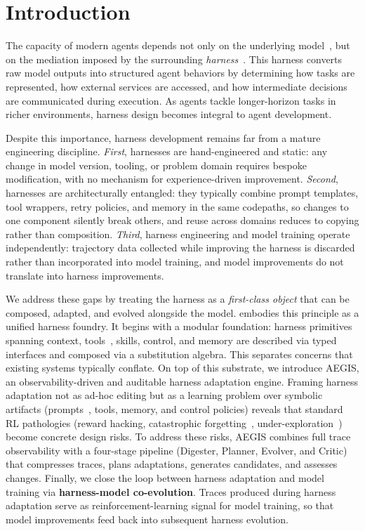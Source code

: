 \section{Introduction}
\label{sec:intro}

The capacity of modern agents depends not only on the underlying model~\cite{deepseekai2026deepseekv4,glm5team2026glm5vibecodingagentic, yang2025qwen3,team2023gemini}, but on the mediation imposed by the surrounding \textit{harness}~\cite{lu2026openclaw,liagent,claudecode}. This harness converts raw model outputs into structured agent behaviors by determining how tasks are represented, how external services are accessed, and how intermediate decisions are communicated during execution. As agents tackle longer-horizon tasks in richer environments, harness design becomes integral to agent development.

Despite this importance, harness development remains far from a mature engineering discipline. \textit{First}, harnesses are hand-engineered and static: any change in model version, tooling, or problem domain requires bespoke modification, with no mechanism for experience-driven improvement. \textit{Second}, harnesses are architecturally entangled: they typically combine prompt templates, tool wrappers, retry policies, and memory in the same codepaths, so changes to one component silently break others, and reuse across domains reduces to copying rather than composition. \textit{Third}, harness engineering and model training operate independently: trajectory data collected while improving the harness is discarded rather than incorporated into model training, and model improvements do not translate into harness improvements.

We address these gaps by treating the harness as a \textit{first-class object} that can be composed, adapted, and evolved alongside the model. \ProjectName embodies this principle as a unified harness foundry. It begins with a modular foundation: harness primitives spanning context, tools~\cite{feng2025retool}, skills, control, and memory are described via typed interfaces and composed via a substitution algebra. This separates concerns that existing systems typically conflate. On top of this substrate, we introduce AEGIS, an observability-driven and auditable harness adaptation engine. Framing harness adaptation not as ad-hoc editing but as a learning problem over symbolic artifacts (prompts~\cite{zhou2025proposer}, tools, memory, and control policies) reveals that standard RL pathologies (reward hacking, catastrophic forgetting~\cite{kirkpatrick2017overcoming}, under-exploration~\cite{ladosz2022exploration}) become concrete design risks. To address these risks, AEGIS combines full trace observability with a four-stage pipeline (Digester, Planner, Evolver, and Critic) that compresses traces, plans adaptations, generates candidates, and assesses changes. Finally, we close the loop between harness adaptation and model training via \textbf{harness-model co-evolution}. Traces produced during harness adaptation serve as reinforcement-learning signal for model training, so that model improvements feed back into subsequent harness evolution.


